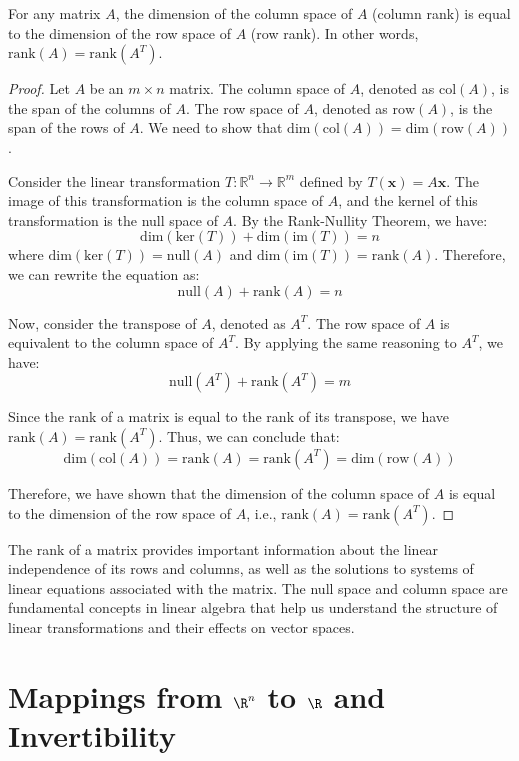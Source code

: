 \documentclass[openany]{book}
\begin{document}
\begin{mytheorem}[Column Rank = Row Rank]
For any matrix $A$, the dimension of the column space of $A$ (column rank) is equal to the dimension of the row space of $A$ (row rank). In other words, $\text{rank}(A) = \text{rank}(A^T)$.
\end{mytheorem}
\begin{proof}
    Let $A$ be an $m \times n$ matrix. The column space of $A$, denoted as $\text{col}(A)$, is the span of the columns of $A$. The row space of $A$, denoted as $\text{row}(A)$, is the span of the rows of $A$. We need to show that $\text{dim}(\text{col}(A)) = \text{dim}(\text{row}(A))$.
    
    Consider the linear transformation $T: \mathbb{R}^n \to \mathbb{R}^m$ defined by $T(\mathbf{x}) = A\mathbf{x}$. The image of this transformation is the column space of $A$, and the kernel of this transformation is the null space of $A$. By the Rank-Nullity Theorem, we have:
    \[
    \text{dim}(\text{ker}(T)) + \text{dim}(\text{im}(T)) = n
    \]
    where $\text{dim}(\text{ker}(T)) = \text{null}(A)$ and $\text{dim}(\text{im}(T)) = \text{rank}(A)$. Therefore, we can rewrite the equation as:
    \[
    \text{null}(A) + \text{rank}(A) = n
    \]
    
    Now, consider the transpose of $A$, denoted as $A^T$. The row space of $A$ is equivalent to the column space of $A^T$. By applying the same reasoning to $A^T$, we have:
    \[
    \text{null}(A^T) + \text{rank}(A^T) = m
    \]
    
    Since the rank of a matrix is equal to the rank of its transpose, we have $\text{rank}(A) = \text{rank}(A^T)$. Thus, we can conclude that:
    \[
    \text{dim}(\text{col}(A)) = \text{rank}(A) = \text{rank}(A^T) = \text{dim}(\text{row}(A))
    \]
    
    Therefore, we have shown that the dimension of the column space of $A$ is equal to the dimension of the row space of $A$, i.e., $\text{rank}(A) = \text{rank}(A^T)$.
\end{proof}
\begin{mynote}
The rank of a matrix provides important information about the linear independence of its rows and columns, as well as the solutions to systems of linear equations associated with the matrix. The null space and column space are fundamental concepts in linear algebra that help us understand the structure of linear transformations and their effects on vector spaces.
\end{mynote}
\section{Mappings from $\R^n$ to $\R$ and Invertibility}
\end{document}

